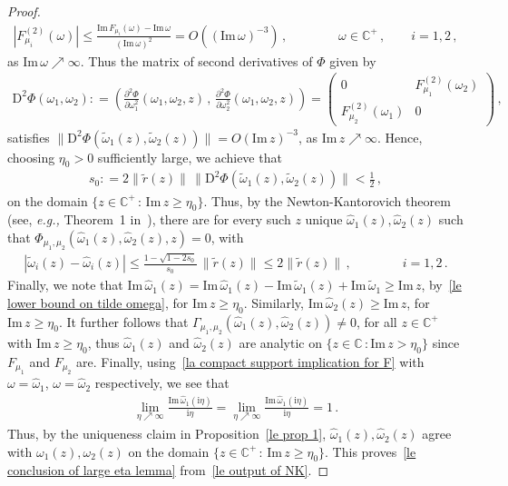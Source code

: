 \documentclass[10pt,reqno]{amsart}
\numberwithin{equation}{section}
\theoremstyle{plain}
\numberwithin{kevin}{section}
\theoremstyle{remark}
\newcommand{\im}{\mathrm{Im}\,}
\newcommand{\C}{{\mathbb C}}
\newcommand{\ii}{\mathrm{i}}
\newcommand{\deq}{\mathrel{\mathop:}=}
\newcommand{\eg}{\emph{e.g., }}
\newcommand{\PP}{\Phi}
\begin{document}
\begin{proof}
\begin{align}
 |F^{(2)}_{\mu_i}(\omega)|\le \frac{\im F_{\mu_i}(\omega)-\im \omega}{(\im \omega)^2}=O((\im \omega)^{-3})\,,\qquad\qquad \omega\in\C^+\,,\qquad i=1,2\,,
\end{align}
as $\im \omega\nearrow\infty$. Thus the matrix of second derivatives of $\PP$ given by
\begin{align*}
 \mathrm{D}^2\PP(\omega_1,\omega_2)\deq\left(\frac{\partial^2 \PP}{\partial\omega_1^2}(\omega_1,\omega_2,z) \,,\, \frac{\partial^2\PP}{\partial \omega_2^2}(\omega_1,\omega_2,z)\right)=\left(\begin{array}{cc}0& F_{\mu_1}^{(2)}(\omega_2) \\  F_{\mu_2}^{(2)}(\omega_1) & 0\end{array} \right)\,,
\end{align*}
satisfies $\|\mathrm{D}^2\PP(\widetilde{\omega}_1(z),\widetilde{\omega}_2(z))\|=O{(\im z)^{-3}}$, as $\im z\nearrow\infty$. Hence, choosing $ \eta_0>0$ sufficiently large, we achieve that
 \begin{align*}
 s_0\deq 2\|\widetilde r(z)\|\,\|\mathrm{D}^2\PP (\widetilde\omega_1(z),\widetilde\omega_2(z))\|<\frac{1}{2}\,,
 \end{align*}
 on the domain $\{z\in \C^+\,:\,\im z\ge \eta_0\}$. Thus, by the Newton-Kantorovich theorem (see, \eg Theorem~1 in~\cite{FS}), there are for every such $z$ unique $\widehat\omega_1(z),\widehat \omega_2(z)$ such that $\PP_{\mu_1,\mu_2}(\widehat\omega_1(z),\widehat\omega_2(z),z)=0$, with 
\begin{align}\label{le output of NK}
|\widetilde\omega_i(z)-\widehat\omega_i(z)|\le \frac{1-\sqrt{1-2s_0}}{s_0}\,\|\widetilde r(z)\|\le  2\|\widetilde r(z)\|\,,\qquad \qquad i=1,2\,.
\end{align}
Finally, we note that $\im \widehat\omega_1(z)=\im\widehat \omega_1(z)-\im \widetilde \omega_1(z)+\im\widetilde \omega_1\ge \im z$, by~\eqref{le lower bound on tilde omega}, for $\im z\ge \eta_0$. Similarly, $\im \widehat\omega_2(z)\ge \im z$, for $\im z\ge \eta_0$. It further follows that $\Gamma_{\mu_1,\mu_2}(\widehat\omega_1(z),\widehat\omega_2(z))\not=0$, for all $z\in\C^+$ with $\im z\ge \eta_0$, thus $\widehat\omega_1(z)$ and $\widehat\omega_2(z)$ are analytic on $\{z\in \C\,:\im z>\eta_0\}$ since $F_{\mu_1}$ and $F_{\mu_2}$ are. Finally, using~\eqref{la compact support implication for F} with $\omega=\widehat\omega_1$, $\omega=\widehat\omega_2$ respectively, we see that 
\begin{align*}
\lim_{\eta\nearrow\infty}\frac{\im \widehat \omega_1(\ii\eta)}{\ii\eta}=\lim_{\eta\nearrow\infty}\frac{\im \widehat \omega_1(\ii\eta)}{\ii\eta}=1\,.
\end{align*}
Thus, by the uniqueness claim in Proposition~\ref{le prop 1}, $\widehat\omega_1(z),\widehat\omega_2(z)$ agree with $\omega_1(z),\omega_2(z)$ on the domain $\{z\in\C^+\,:\, \im z\ge \eta_0\}$. This proves~\eqref{le conclusion of large eta lemma} from~\eqref{le output of NK}. \qedhere
\end{proof}
\end{document}
